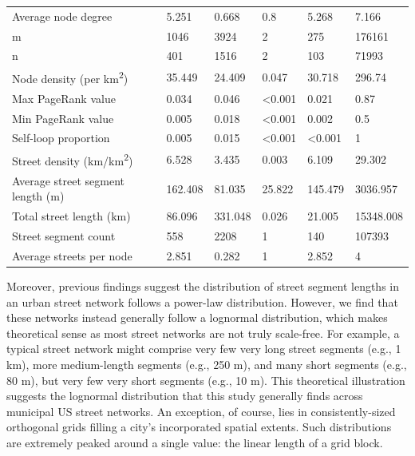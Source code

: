 \documentclass{article}
\begin{document}
\begin{table}
\begin{tabular}{llllll}
	Average node degree                         & 5.251   & 0.668   & 0.8            & 5.268          & 7.166     \\
	m                                           & 1046    & 3924    & 2              & 275            & 176161    \\
	n                                           & 401     & 1516    & 2              & 103            & 71993     \\
	Node density (per km\textsuperscript{2})                      & 35.449  & 24.409  & 0.047          & 30.718         & 296.74    \\
	Max PageRank value                          & 0.034   & 0.046   & \textless0.001 & 0.021          & 0.87      \\
	Min PageRank value                          & 0.005   & 0.018   & \textless0.001 & 0.002          & 0.5       \\
	Self-loop proportion                        & 0.005   & 0.015   & \textless0.001 & \textless0.001 & 1         \\
	Street density (km/km\textsuperscript{2})                     & 6.528   & 3.435   & 0.003          & 6.109          & 29.302    \\
	Average street segment length (m)           & 162.408 & 81.035  & 25.822         & 145.479        & 3036.957  \\
	Total street length (km)                    & 86.096  & 331.048 & 0.026          & 21.005         & 15348.008 \\
	Street segment count                        & 558     & 2208    & 1              & 140            & 107393    \\
	Average streets per node                    & 2.851   & 0.282   & 1              & 2.852          & 4         \\
	\bottomrule
\end{tabular}
\end{table}

Moreover, previous findings \citep[e.g.,][]{masucci_random_2009} suggest the distribution of street segment lengths in an urban street network follows a power-law distribution. However, we find that these networks instead generally follow a lognormal distribution, which makes theoretical sense as most street networks are not truly scale-free. For example, a typical street network might comprise very few very long street segments (e.g., 1 km), more medium-length segments (e.g., 250 m), and many short segments (e.g., 80 m), but very few very short segments (e.g., 10 m). This theoretical illustration suggests the lognormal distribution that this study generally finds across municipal US street networks. An exception, of course, lies in consistently-sized orthogonal grids filling a city's incorporated spatial extents. Such distributions are extremely peaked around a single value: the linear length of a grid block.
\end{document}
